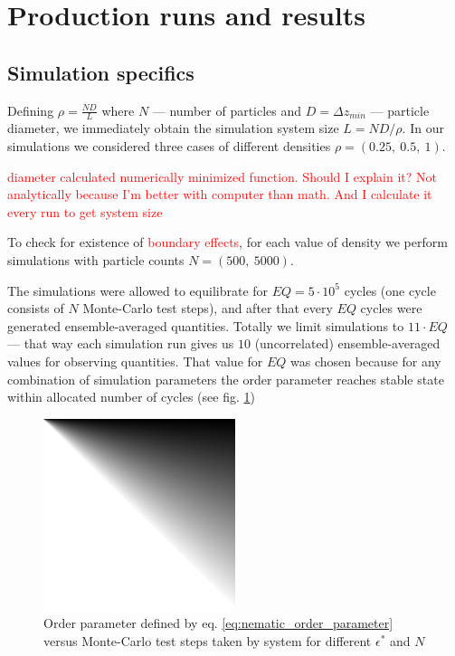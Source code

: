 \section{Production runs and results}
\subsection{Simulation specifics}

Defining $\rho = \frac{N D}{L}$ where $N$ --- number of particles and $D = \Delta z_{min}$ --- particle diameter, we immediately obtain the simulation system size $L = N D/ \rho$. In our simulations we considered three cases of different densities $\rho = (0.25,\ 0.5,\ 1)$.

\textcolor{red}{diameter calculated numerically minimized function. Should I explain it? Not analytically because I'm better with computer than math. And I calculate it every run to get system size}

To check for existence of \textcolor{red}{boundary effects}, for each value of density we perform simulations with particle counts $N = (500,\ 5000)$.

The simulations were allowed to equilibrate for $EQ = 5 \cdot 10^5$ cycles (one cycle consists of $N$ Monte-Carlo test steps), and after that every $EQ$ cycles were generated ensemble-averaged quantities. Totally we limit simulations to $11\cdot EQ$ --- that way each simulation run gives us $10$ (uncorrelated) ensemble-averaged values for observing quantities. That value for $EQ$ was chosen because for any combination of simulation parameters the order parameter reaches stable state within allocated number of cycles (see fig. \ref{fig:nematic_op_vs_MC_cycles})

\begin{figure}[h]
	\centering
	\includegraphics[width=0.5\textwidth]{Images/dummy.png}
	\captionsetup{justification=centering, width=0.9\textwidth}
	\caption{Order parameter defined by eq. \eqref{eq:nematic_order_parameter} versus Monte-Carlo test steps taken by system for different $\epsilon^*$ and $N$}
	\label{fig:nematic_op_vs_MC_cycles}
\end{figure}

